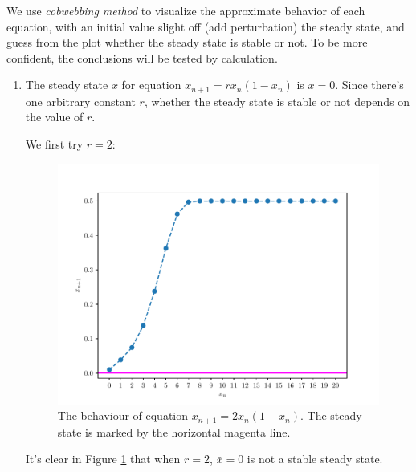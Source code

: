 \begin{homeworkProblem}[2]
We use \textit{cobwebbing method} to visualize the approximate behavior of each
equation, with an initial value slight off (add perturbation) the steady state,
and guess from the plot whether the steady state is stable or not. To be more
confident, the conclusions will be tested by calculation.

\begin{enumerate}
\item The steady state $\bar x$ for equation $x_{n+1} = rx_n(1-x_n)$ is
$\bar x = 0$. Since there's one arbitrary constant $r$, whether the steady
state is stable or not depends on the value of $r$.

We first try $r=2$:
\begin{figure}
    \centering
    \caption[The behavior of equation $x_{n+1} = 2x_n(1-x_n)$]
    {The behaviour of equation $x_{n+1} = 2x_n(1-x_n)$. The
    steady state is marked by the horizontal magenta line.}
    \label{fig:fig2a1}
    \includegraphics[scale=0.6]{../fig/fig2(a)(1).pdf}
\end{figure}
It's clear in Figure \ref{fig:fig2a1} that when $r=2$, $\bar x = 0$ is not a
stable steady state.


\end{enumerate}
\end{homeworkProblem}
